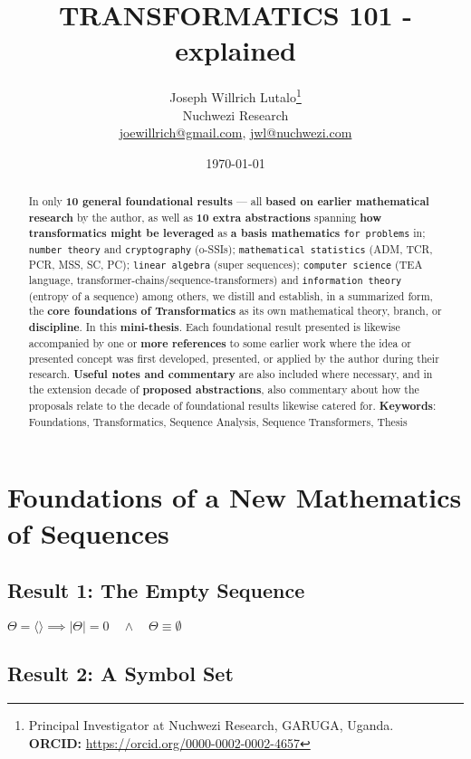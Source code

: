 \documentclass[11pt,a4paper]{article}
\title{TRANSFORMATICS 101 - explained}
\author{Joseph Willrich Lutalo\thanks{Principal Investigator at Nuchwezi Research, GARUGA, Uganda.\\ \textbf{ORCID:} \url{https://orcid.org/0000-0002-0002-4657}}\\Nuchwezi Research\\\href{mailto:joewillrich@gmail.com}{joewillrich@gmail.com}, \href{mailto:jwl@nuchwezi.com}{jwl@nuchwezi.com}}
\date \today
\begin{document}
\maketitle

\begin{abstract}
\Large
In only \textbf{10 general foundational results}\cite{Lutalo2025_trans_101}\cite{lutalo_2025_trans101_1page} --- all \textbf{based on earlier mathematical research} by the author, as well as \textbf{10 extra abstractions} spanning \textbf{how transformatics might be leveraged} as \textbf{a basis mathematics} \texttt{for problems} in; \texttt{number theory} and \texttt{cryptography} (o-SSIs); \texttt{mathematical statistics} (ADM, TCR, PCR, MSS, SC, PC); \texttt{linear algebra} (super sequences); \texttt{computer science} (TEA language, transformer-chains/sequence-transformers) and \texttt{information theory} (entropy of a sequence) among others, we distill and establish, in a summarized form, the \textbf{core foundations of Transformatics}\cite{transformatics} as its own mathematical theory, branch, or \textbf{discipline}. In this \textbf{mini-thesis}. Each foundational result presented is likewise accompanied by one or \textbf{more references} to some earlier work where the idea or presented concept was first developed, presented, or applied by the author during their research. \textbf{Useful notes and commentary} are also included where necessary, and in the extension decade of \textbf{proposed abstractions}, also commentary about how the proposals relate to the decade of foundational results likewise catered for.
 \newline\newline
     \textbf{Keywords}: Foundations, Transformatics, Sequence Analysis,  Sequence Transformers, Thesis
\end{abstract}

\section{Foundations of a New Mathematics of Sequences}

\subsection{Result 1: The Empty Sequence\cite{lnspaper}}

$\Theta = \langle \rangle \implies |\Theta| = 0 \quad \land \quad \Theta \equiv \emptyset$

\subsection{Result 2: A Symbol Set\cite{Lutalo2024gtnc}}
\end{document}
